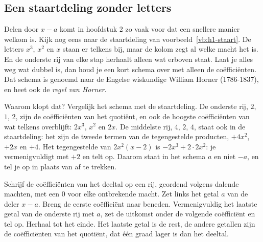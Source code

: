 \subsection{Een staartdeling zonder letters}

Delen door $x - a$ komt in hoofdstuk 2 zo vaak voor dat een snellere manier welkom is. Kijk nog eens naar de staartdeling van voorbeeld~\ref{vb:h1-staart}. De letters $x^3$, $x^2$ en $x$ staan er telkens bij, maar de kolom zegt al welke macht het is. En de onderste rij van elke stap herhaalt alleen wat erboven staat. Laat je alles weg wat dubbel is, dan houd je een kort schema over met alleen de coëfficiënten. Dat schema is genoemd naar de Engelse wiskundige William Horner (1786-1837), en heet ook de \textit{regel van Horner}.


Waarom klopt dat? Vergelijk het schema met de staartdeling. De onderste rij, $2$, $1$, $2$, zijn de coëfficiënten van het quotiënt, en ook de hoogste coëfficiënten van wat telkens overblijft: $2x^3$, $x^2$ en $2x$. De middelste rij, $4$, $2$, $4$, staat ook in de staartdeling: het zijn de tweede termen van de tegengestelde producten, $+4x^2$, $+2x$ en $+4$. Het tegengestelde van $2x^2(x - 2)$ is $-2x^3 + 2 \cdot 2x^2$: je vermenigvuldigt met $+2$ en telt op. Daarom staat in het schema $a$ en niet $-a$, en tel je op in plaats van af te trekken.

\begin{werkwijze}
Schrijf de coëfficiënten van het deeltal op een rij, geordend volgens dalende machten, met een $0$ voor elke ontbrekende macht. Zet links het getal $a$ van de deler $x - a$. Breng de eerste coëfficiënt naar beneden. Vermenigvuldig het laatste getal van de onderste rij met $a$, zet de uitkomst onder de volgende coëfficiënt en tel op. Herhaal tot het einde. Het laatste getal is de rest, de andere getallen zijn de coëfficiënten van het quotiënt, dat één graad lager is dan het deeltal.
\end{werkwijze}

